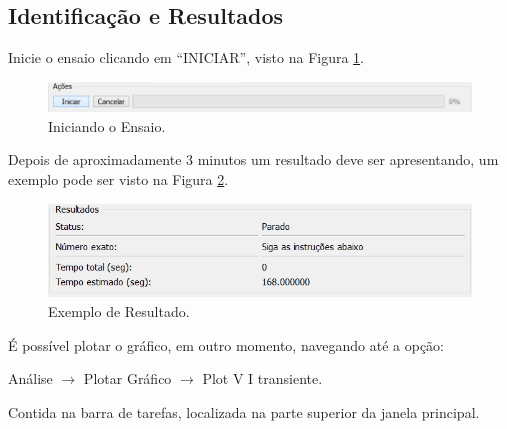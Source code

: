 \documentclass[a4paper, 10pt]{article}
\begin{document}
\subsection{Identificação e Resultados}

Inicie o ensaio clicando em ``INICIAR'', visto na Figura \ref{fig_iniciando_ensaio}.

\begin{figure}[H]
        \caption{\label{fig_iniciando_ensaio}Iniciando o Ensaio.}
	    \begin{center}
            \includegraphics[scale=0.4]{../fotos/execucao/iniciando_amostragem.png}
	    \end{center}
\end{figure}

Depois de aproximadamente 3 minutos um resultado deve ser apresentando, um exemplo
pode ser visto na Figura \ref{fig_ex_resultado}.

\begin{figure}[H]
        \caption{\label{fig_ex_resultado}Exemplo de Resultado.}
	    \begin{center}
            \includegraphics[scale=0.4]{../fotos/execucao/resultados.png}
	    \end{center}
\end{figure}


É possível plotar o gráfico, em outro momento, navegando até a opção:

Análise $\rightarrow$ Plotar Gráfico $\rightarrow$ Plot V I transiente. 

Contida na barra de tarefas, localizada na parte superior da janela principal.
\end{document}
